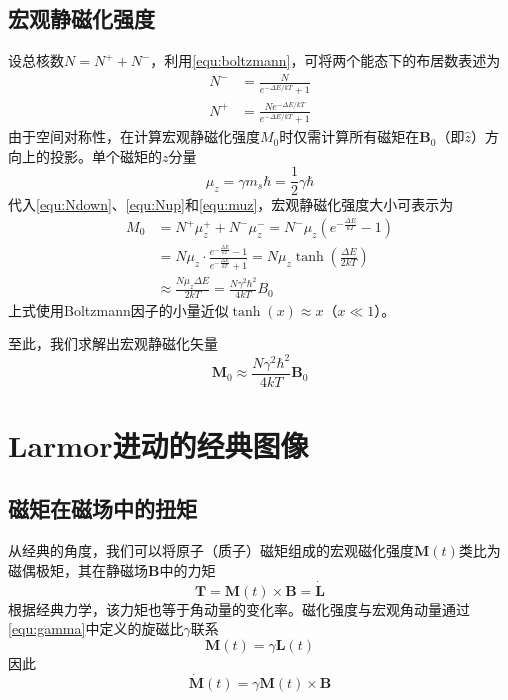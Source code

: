\documentclass[12pt]{article}
\begin{document}
\subsection{宏观静磁化强度}
设总核数$N=N^++N^-$，利用\autoref{equ:boltzmann}，可将两个能态下的布居数表述为
\begin{align}
    N^-&=\frac{N}{e^{-\Delta E/kT} + 1} \label{equ:Ndown}\\
    N^+&=\frac{Ne^{-\Delta E/kT}}{e^{-\Delta E/kT}+1} \label{equ:Nup}
\end{align}
由于空间对称性，在计算宏观静磁化强度$M_0$时仅需计算所有磁矩在$\bm{B}_0$（即$\hat{z}$）方向上的投影。单个磁矩的$z$分量
\begin{equation}
    \mu_z=\gamma m_s\hbar=\frac{1}{2}\gamma\hbar
    \label{equ:muz}
\end{equation}
代入\autoref{equ:Ndown}、\autoref{equ:Nup}和\autoref{equ:muz}，宏观静磁化强度大小可表示为
\begin{equation}
    \begin{aligned}
        M_0&=N^+\mu_z^++N^-\mu_z^-=N^-\mu_z\left(e^{-\frac{\Delta E}{kT}}-1\right)\\
        &=N\mu_z\cdot\frac{e^{-\frac{\Delta E}{kT}}-1}{e^{-\frac{\Delta E}{kT}}+1}=N\mu_z\tanh\left(\frac{\Delta E}{2kT}\right)\\
        &\approx\frac{N\mu_z\Delta E}{2kT}=\frac{N\gamma^2\hbar^2}{4kT}B_0
    \end{aligned}
\end{equation}
上式使用Boltzmann因子的小量近似$\tanh(x)\approx x$（$x\ll 1$）。

至此，我们求解出宏观静磁化矢量
\begin{equation}
    \boxed{\bm{M}_0\approx\frac{N\gamma^2\hbar^2}{4kT}\bm{B}_0}
    \label{equ:M0}
\end{equation}

\section{Larmor进动的经典图像}
\subsection{磁矩在磁场中的扭矩}
从经典的角度，我们可以将原子（质子）磁矩组成的宏观磁化强度$\bm{M}(t)$类比为磁偶极矩，其在静磁场$\bm{B}$中的力矩
\begin{equation}
    \bm{T}=\bm{M}(t)\times\bm{B}=\dot{\bm{L}}
\end{equation}
根据经典力学，该力矩也等于角动量的变化率。磁化强度与宏观角动量通过\autoref{equ:gamma}中定义的旋磁比$\gamma$联系
\begin{equation}
    \bm{M}(t)=\gamma\bm{L}(t)
\end{equation}
因此
\begin{equation}
    \boxed{\dot{\bm{M}}(t)=\gamma\bm{M}(t)\times\bm{B}}
\end{equation}
\end{document}
